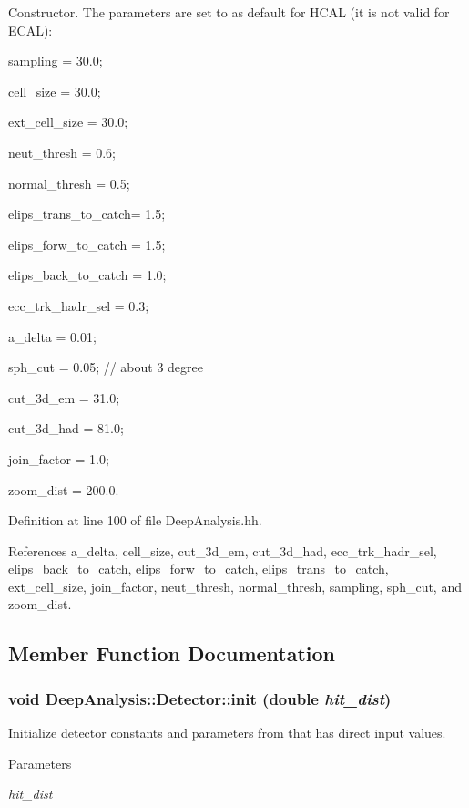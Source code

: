Constructor. The parameters are set to as default for HCAL (it is not valid for ECAL):
\begin{DoxyItemize}
\item sampling = 30.0;
\item cell\_\-size = 30.0;
\item ext\_\-cell\_\-size = 30.0;
\item neut\_\-thresh = 0.6;
\item normal\_\-thresh = 0.5;
\item elips\_\-trans\_\-to\_\-catch= 1.5;
\item elips\_\-forw\_\-to\_\-catch = 1.5;
\item elips\_\-back\_\-to\_\-catch = 1.0;
\item ecc\_\-trk\_\-hadr\_\-sel = 0.3;
\item a\_\-delta = 0.01;
\item sph\_\-cut = 0.05; // about 3 degree
\item cut\_\-3d\_\-em = 31.0;
\item cut\_\-3d\_\-had = 81.0;
\item join\_\-factor = 1.0;
\item zoom\_\-dist = 200.0. 
\end{DoxyItemize}

Definition at line 100 of file DeepAnalysis.hh.

References a\_\-delta, cell\_\-size, cut\_\-3d\_\-em, cut\_\-3d\_\-had, ecc\_\-trk\_\-hadr\_\-sel, elips\_\-back\_\-to\_\-catch, elips\_\-forw\_\-to\_\-catch, elips\_\-trans\_\-to\_\-catch, ext\_\-cell\_\-size, join\_\-factor, neut\_\-thresh, normal\_\-thresh, sampling, sph\_\-cut, and zoom\_\-dist.

\subsection{Member Function Documentation}
\subsubsection[{init}]{\setlength{\rightskip}{0pt plus 5cm}void DeepAnalysis::Detector::init (double {\em hit\_\-dist})\hspace{0.3cm}{\ttfamily  [inline]}}\label{classDeepAnalysis_1_1Detector_af1367d6f7b438f4a33bd5fe86fcb5281}


Initialize detector constants and parameters from that has direct input values. 
\begin{DoxyParams}{Parameters}
\item[{\em hit\_\-dist}]\end{DoxyParams}



